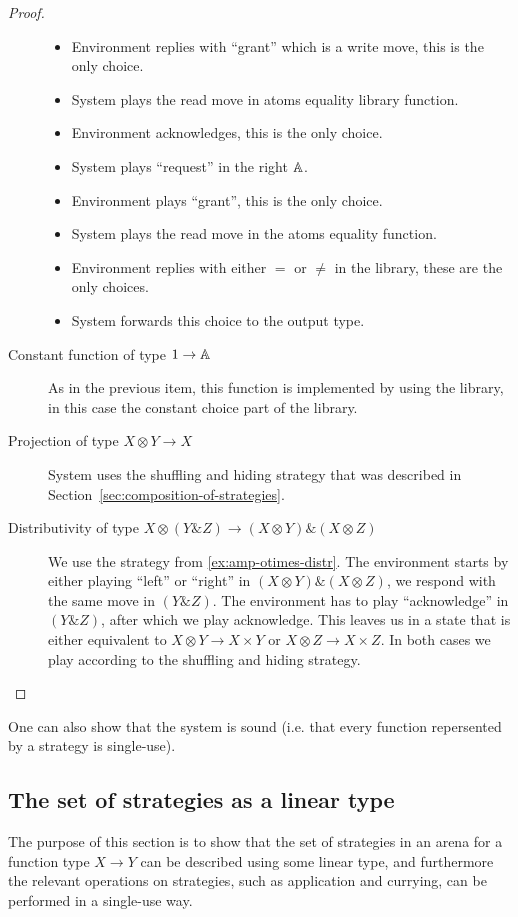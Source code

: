 \begin{proof}
\begin{description}
\begin{itemize}
    \item Environment replies with ``grant'' which is a write move, this is the only choice.
    \item System plays the read move in atoms equality library function.
    \item Environment acknowledges, this is the only choice.
    \item System plays  ``request'' in the right $\mathbb A$.
    \item Environment plays ``grant'', this is the only choice.
    \item System plays the read move in the atoms equality function.
    \item Environment replies with either $=$ or $\neq$ in the library, these are the only choices.
    \item System forwards this choice to the output type.
\end{itemize}
        

        \item[Constant function of type $1 \to \mathbb A$] As in the previous item, this function is implemented by using the library, in this case the constant choice part of the library. 

        \item[Projection of type $ X \otimes Y \to X$] System uses the  shuffling and hiding strategy that was described in Section~\ref{sec:composition-of-strategies}. 

        \item[Distributivity  of type $X \otimes (Y \& Z) \to (X \otimes Y) \& (X \otimes Z)$] We use the  strategy from \ref{ex:amp-otimes-distr}.  The environment 
        starts by either playing ``left'' or ``right'' in $(X \otimes Y) \& (X \otimes Z)$, 
        we respond with the same move in $(Y \& Z)$. The environment has to play ``acknowledge'' 
        in $(Y \& Z)$, after which we play acknowledge. This leaves us in a state that is either 
        equivalent to $X \otimes Y \to X \times Y$ or  $X \otimes Z \to X \times Z$. 
        In both cases we play according to the shuffling and hiding strategy. 
    \end{description}
\end{proof}
One can also show that the system is sound (i.e. that every function repersented by a strategy is single-use). 

\subsection{The set of strategies as a linear type}
The purpose of this section is to show that the set of strategies in an arena for a function type $X \to Y$ can be described using some linear type, and furthermore the relevant operations on strategies, such as application and currying, can be performed in a single-use way.

